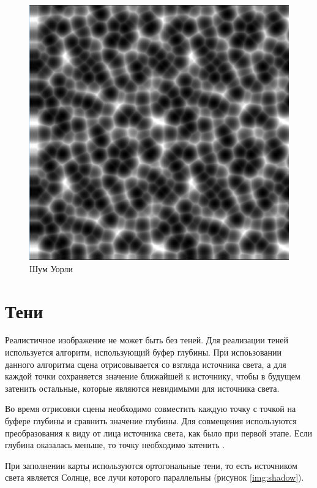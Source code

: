 \begin{figure}[H]
    \centering
    \includegraphics[scale=0.4]{img/worley.png}
    \caption{Шум Уорли}
    \label{img:worley}
\end{figure}

\section{Тени}

Реалистичное изображение не может быть без теней. Для реализации теней используется алгоритм, использующий
буфер глубины. При испоьзовании данного алгоритма сцена отрисовывается со взгляда источника света, а для каждой
точки сохраняется значение ближайшей к источнику, чтобы в будущем затенить остальные, которые являются невидимыми
для источника света.

Во время отрисовки сцены необходимо совместить каждую точку с точкой на буфере глубины и сравнить значение глубины.
Для совмещения используются преобразования к виду от лица источника света, как было при первой этапе.
Если глубина оказалась меньше, то точку необходимо затенить \cite{shadowmapping}.

При заполнении карты используются ортогональные тени, то есть источником света является Солнце, все лучи которого
параллельны (рисунок \ref{img:shadow}).

